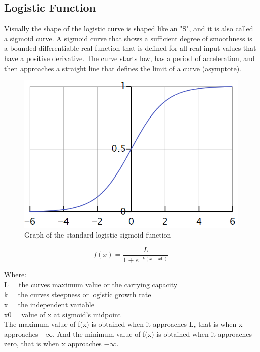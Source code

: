 \documentclass[conference]{IEEEtran}
\begin{document}
\subsection{Logistic Function}
Visually the shape of the logistic curve is shaped like an "S", and it is also called a sigmoid curve.
A sigmoid curve that shows a sufficient degree of smoothness is a bounded differentiable real function that is defined for all real input values that have a positive derivative\cite{bb7}. The curve starts low, has a period of acceleration, and then approaches a straight line that defines the limit of a curve (asymptote).

\begin{figure}[h]
    \centering
    \includegraphics[scale=0.62]{figs/Lfunction.png}
    \caption{Graph of the standard logistic sigmoid function \cite{img}}
    \label{dabc}        
\end{figure}

\begin{equation} 
\label{equ2}
f(x) = \frac{L}{1 + e{^{-k(x-x0)}}}
\end{equation} 

Where:\\
L = the curves maximum value or the carrying capacity\\
k = the curves steepness or logistic growth rate\\
x = the independent variable\\
x0 = value of x at sigmoid's midpoint\\

The maximum value of f(x) is obtained when it approaches L, that is when x approaches $+\infty$. And the minimum value of f(x) is obtained when it approaches zero, that is when x approaches $-\infty$.
\end{document}

